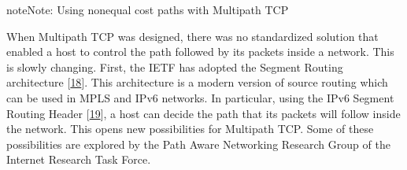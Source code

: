 \documentclass[letterpaper,10pt,english]{sphinxmanual}
\begin{document}
\begin{sphinxadmonition}{note}{Note:}
\sphinxAtStartPar
Using non\sphinxhyphen{}equal cost paths with Multipath TCP

\sphinxAtStartPar
When Multipath TCP was designed, there was no standardized solution that enabled a host to control the path followed by its packets inside a network. This is slowly changing. First, the IETF has adopted the Segment Routing architecture {[}\hyperlink{cite.biblio:id8227}{18}{]}. This architecture is a modern version of source routing which can be used in MPLS and IPv6 networks. In particular, using the IPv6 Segment Routing Header {[}\hyperlink{cite.biblio:id8570}{19}{]}, a host can decide the path that its packets will follow inside the network. This opens new possibilities for Multipath TCP. Some of these possibilities are explored by the Path Aware Networking Research Group of the Internet Research Task Force.
\end{sphinxadmonition}
\end{document}
